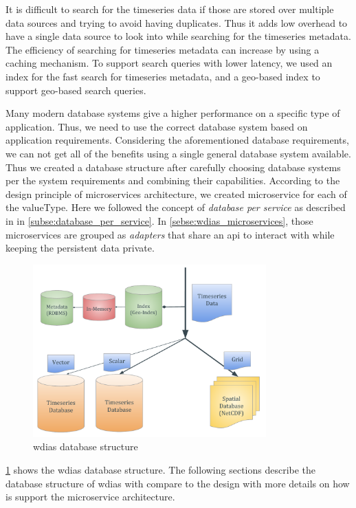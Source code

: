 It is difficult to search for the timeseries data if those are stored over multiple data sources and trying to avoid having duplicates. Thus it adds low overhead to have a single data source to look into while searching for the timeseries metadata. The efficiency of searching for timeseries metadata can increase by using a caching mechanism. To support search queries with lower latency, we used an index for the fast search for timeseries metadata, and a geo-based index to support geo-based search queries.

Many modern database systems give a higher performance on a specific type of application. Thus, we need to use the correct database system based on application requirements. Considering the aforementioned database requirements, we can not get all of the benefits using a single general database system available. Thus we created a database structure after carefully choosing database systems per the system requirements and combining their capabilities. According to the design principle of microservices architecture, we created microservice for each of the valueType. Here we followed the concept of \emph{database per service} as described in in \cref{subse:database_per_service}. In \cref{sebse:wdias_microservices}, those microservices are grouped as \emph{adapters} that share an \acrshort{api} to interact with while keeping the persistent data private.

\begin{figure}[htp]
    \centering
    \includegraphics[width=0.8\textwidth]{method/microservice/wdias_database_structure.pdf}
    \caption{\acrshort{wdias} database structure}
    \label{fi:database_structure}
\end{figure}

\cref{fi:database_structure} shows the \acrshort{wdias} database structure.
The following sections describe the database structure of \acrshort{wdias} with compare to the design with more details on how is support the microservice architecture.

